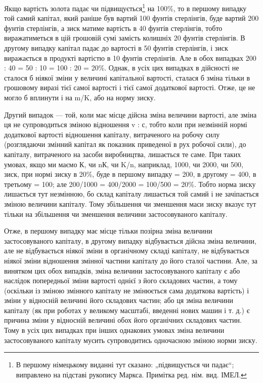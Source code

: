 Якщо вартість золота падає чи підвищується\footnote*{
В першому німецькому виданні тут сказано: „підвищується чи падає“;
виправлено на підставі рукопису Маркса. Примітка ред. нім. вид. ІМЕЛ.
} на 100\%, то
в першому випадку той самий капітал, який раніше був вартий
100 фунтів стерлінгів, буде вартий 200 фунтів стерлінгів, а зиск
матиме вартість в 40 фунтів стерлінгів, тобто виражатиметься
в цій грошовій сумі замість колишніх 20 фунтів стерлінгів.
В другому випадку капітал падає до вартості в 50 фунтів
стерлінгів, і зиск виражається в продукті вартістю в 10 фунтів
стерлінгів. Але в обох випадках 200 : 40 = 50 : 10 = 100 : 20 = 20\%.
Однак, в усіх цих випадках в дійсності не сталося б ніякої
зміни у величині капітальної вартості, сталася б зміна тільки
в грошовому виразі тієї самої вартості і тієї самої додаткової
вартості. Отже, це не могло б вплинути і на m/K, або на норму
зиску.

Другий випадок — той, коли має місце дійсна зміна величини
вартості, але зміна ця не супроводиться зміною відношення
v : с, тобто коли при незмінній нормі додаткової вартості відношення
капіталу, витраченого на робочу силу (розглядаючи
змінний капітал як показник приведеної в рух робочої сили), до
капіталу, витраченого на засоби виробництва, лишається те
саме. При таких умовах, якщо ми маємо К, чи nК, чи K/n, наприклад,
1000, чи 2000, чи 500, зиск, при нормі зиску в 20\%,
буде в першому випадку = 200, в другому = 400, в третьому = 100;
але 200/1000 = 400/2000 = 100/500 = 20\%. Тобто норма зиску лишається тут
незмінною, бо склад капіталу лишається той самий і не зачіпається
зміною величини капіталу. Тому збільшення чи зменшення
маси зиску вказує тут тільки на збільшення чи зменшення
величини застосовуваного капіталу.

Отже, в першому випадку має місце тільки позірна зміна
величини застосовуваного капіталу, в другому випадку відбувається
дійсна зміна величини, але не відбувається ніякої зміни
в органічному складі капіталу, не відбувається ніякої зміни
відношення змінної частини капіталу до його сталої частини.
Але, за винятком цих обох випадків, зміна величини застосовуваного
капіталу є або наслідок попередньої зміни вартості
однієї з його складових частин, а тому (оскільки із зміною змінного
капіталу не змінюється сама додаткова вартість) і зміни
у відносній величині його складових частин; або ця зміна величини
капіталу (як при роботах у великому масштабі, введенні нових
машин і т. д.) є причина зміни у відносній величині обох його
органічних складових частин. Тому в усіх цих випадках при
інших однакових умовах зміна величини застосовуваного капіталу
мусить супроводитись одночасною зміною норми зиску.